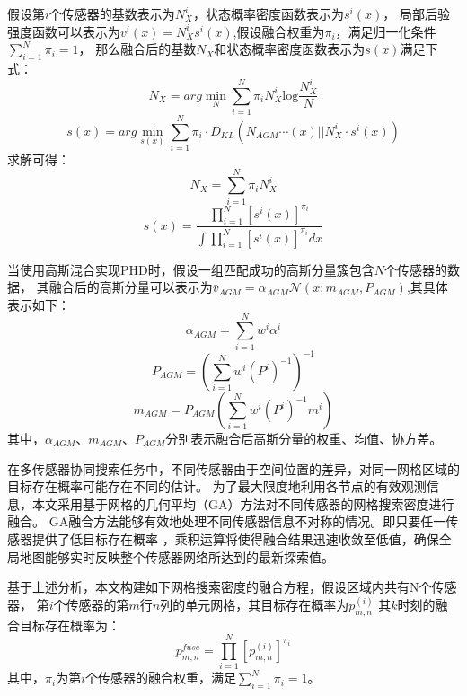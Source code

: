 假设第$i$个传感器的基数表示为$N_X^i$，状态概率密度函数表示为${s}^i(x)$，
局部后验强度函数可以表示为$v^i(x) = N_X^i s^i(x)$,假设融合权重为$\pi_i$，满足归一化条件$\sum_{i=1}^{N} \pi_i = 1$，
那么融合后的基数$N_X$和状态概率密度函数表示为$s(x)$满足下式：
\begin{equation}
    N_X = arg\min_N\sum_{i=1}^N\pi_iN_X^i\mathrm{log}\frac{N_X^i}{N}
    \label{eq:AA融合基数}
\end{equation}
\begin{equation}
    s(x) = arg\min_{s(x)}\sum_{i=1}^{N}\pi_i\cdot D_{KL}\left(N_{AGM}\cdots(x)||N_{X}^{i}\cdot s^{i}(x)\right)
    \label{eq:GA融合状态分布}
\end{equation}
求解可得：
\begin{equation}
    N_X = \sum_{i=1}^{N} \pi_i N_X^i
    \label{eq:AA融合基数2}
\end{equation}
\begin{equation}
    s(x) = \frac{\prod_{i=1}^{N} \left[ s^i(x) \right]^{\pi_i}}{\int \prod_{i=1}^{N} \left[ s^i(x) \right]^{\pi_i} dx}
    \label{eq:GA融合状态分布2}
\end{equation}

当使用高斯混合实现PHD时，假设一组匹配成功的高斯分量簇包含$N$个传感器的数据，
其融合后的高斯分量可以表示为$\bar{v}_{AGM}=\alpha_{AGM}\mathcal{N}(x;m_{AGM},P_{AGM})$,其具体表示如下：
\begin{equation}
\alpha_{AGM}=\sum_{i=1}^Nw^i\alpha^i
\end{equation}
\begin{equation}
P_{AGM}=\left(\sum_{i=1}^Nw^i(P^i)^{-1}\right)^{-1}
\end{equation}
\begin{equation}
m_{AGM}=P_{AGM}\left(\sum_{i=1}^Nw^i(P^i)^{-1}m^i\right)
\end{equation}
其中，$\alpha_{AGM}$、$m_{AGM}$、$P_{AGM}$分别表示融合后高斯分量的权重、均值、协方差。

在多传感器协同搜索任务中，不同传感器由于空间位置的差异，对同一网格区域的目标存在概率可能存在不同的估计。
为了最大限度地利用各节点的有效观测信息，本文采用基于网格的几何平均（GA）方法对不同传感器的网格搜索密度进行融合。
GA融合方法能够有效地处理不同传感器信息不对称的情况。即只要任一传感器提供了低目标存在概率
，乘积运算将使得融合结果迅速收敛至低值，确保全局地图能够实时反映整个传感器网络所达到的最新探索值。

基于上述分析，本文构建如下网格搜索密度的融合方程，假设区域内共有N个传感器，
第$i$个传感器的第$m$行$n$列的单元网格，其目标存在概率为$p_{m,n}^{(i)}$
其$k$时刻的融合目标存在概率为：
\begin{equation}
p_{m,n}^{fuse} =  \prod_{i=1}^{N} \left[ p_{m,n}^{(i)}  \right]^{\pi_i}
\label{eq:GCI_Fusion}
\end{equation}
其中，$\pi_i$为第$i$个传感器的融合权重，满足$\sum_{i=1}^{N} \pi_i = 1$。

